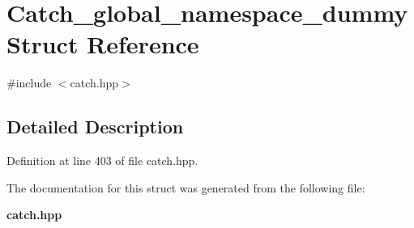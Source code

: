 \section{Catch\+\_\+global\+\_\+namespace\+\_\+dummy Struct Reference}
\label{struct_catch__global__namespace__dummy}


{\ttfamily \#include $<$catch.\+hpp$>$}



\subsection{Detailed Description}


Definition at line 403 of file catch.\+hpp.



The documentation for this struct was generated from the following file\+:\begin{DoxyCompactItemize}
\item 
\textbf{ catch.\+hpp}\end{DoxyCompactItemize}
